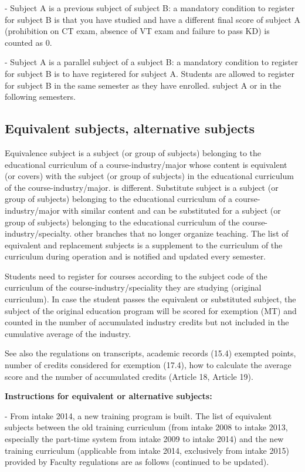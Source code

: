 - Subject A is a previous subject of subject B: a mandatory condition to register for subject B is that you have studied and have a different final score of subject A (prohibition on CT exam, absence of VT exam and failure to pass KD) is counted as 0.

- Subject A is a parallel subject of a subject B: a mandatory condition to register for subject B is to have registered for subject A. Students are allowed to register for subject B in the same semester as they have enrolled. subject A or in the following semesters.

\subsection{Equivalent subjects, alternative subjects}
Equivalence subject is a subject (or group of subjects) belonging to the educational curriculum of a course-industry/major whose content is equivalent (or covers) with the subject (or group of subjects) in the educational curriculum of the course-industry/major. is different. Substitute subject is a subject (or group of subjects) belonging to the educational curriculum of a course-industry/major with similar content and can be substituted for a subject (or group of subjects) belonging to the educational curriculum of the course-industry/specialty. other branches that no longer organize teaching. The list of equivalent and replacement subjects is a supplement to the curriculum of the curriculum during operation and is notified and updated every semester.

Students need to register for courses according to the subject code of the curriculum of the course-industry/speciality they are studying (original curriculum). In case the student passes the equivalent or substituted subject, the subject of the original education program will be scored for exemption (MT) and counted in the number of accumulated industry credits but not included in the cumulative average of the industry.

See also the regulations on transcripts, academic records (15.4) exempted points, number of credits considered for exemption (17.4), how to calculate the average score and the number of accumulated credits (Article 18, Article 19).

\noindent\textbf{Instructions for equivalent or alternative subjects:}

- From intake 2014, a new training program is built. The list of equivalent subjects between the old training curriculum (from intake 2008 to intake 2013, especially the part-time system from intake 2009 to intake 2014) and the new training curriculum (applicable from intake 2014, exclusively from intake 2015) provided by Faculty regulations are as follows (continued to be updated).

